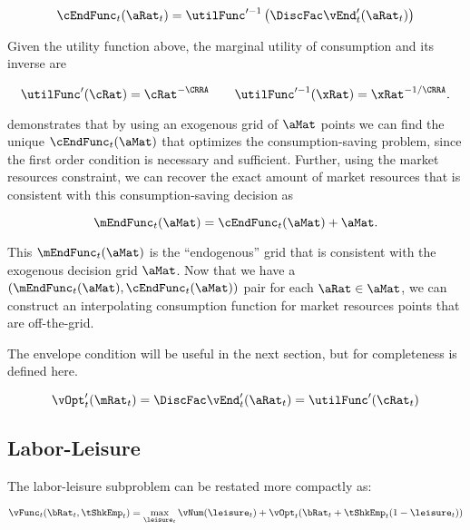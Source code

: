 \documentclass[\econtexRoot/SequentialEGM]{subfiles}
\begin{document}
\begin{equation}
	\cEndFunc_{t}(\aRat_{t}) = \utilFunc'^{-1}\left( \DiscFac \vEnd_{t}'(\aRat_{t})
	\right)
\end{equation}

Given the utility function above, the marginal utility of consumption and its inverse are

\begin{equation}
	\utilFunc'(\cRat) = \cRat^{-\CRRA} \qquad \utilFunc'^{-1}(\xRat) =
	\xRat^{-1/\CRRA}.
\end{equation}

\cite{Carroll2006-wq} demonstrates that by using an exogenous grid of $\aMat$ points we can find the unique
$\cEndFunc_{t}(\aMat)$ that optimizes the consumption-saving problem, since the first order condition is necessary and sufficient.
Further, using the market resources constraint, we can recover the exact amount
of market resources that is consistent with this consumption-saving decision as

\begin{equation}
	\mEndFunc_{t}(\aMat) = \cEndFunc_{t}(\aMat) + \aMat.
\end{equation}

This $\mEndFunc_{t}(\aMat)$ is the ``endogenous'' grid that is consistent
with the exogenous decision grid $\aMat$. Now that we have a
$(\mEndFunc_{t}(\aMat), \cEndFunc_{t}(\aMat))$ pair for each
$\aRat \in \aMat$, we can construct an interpolating consumption function for
market resources points that are off-the-grid.

The envelope condition will be useful in the next section, but for completeness
is defined here.

\begin{equation}
	\vOpt_{t}'(\mRat_{t}) = \DiscFac \vEnd_{t}'(\aRat_{t}) = \utilFunc'(\cRat_{t})
\end{equation}

\subsection{Labor-Leisure}

The labor-leisure subproblem can  be restated more compactly as:

\begin{equation}
	\vFunc_{t}(\bRat_{t}, \tShkEmp_{t}) = \max_{ \leisure_{t}}
	\vNum(\leisure_{t}) + \vOpt_{t}(\bRat_{t} +
	\tShkEmp_{t}(1-\leisure_{t}))
\end{equation}
\end{document}
